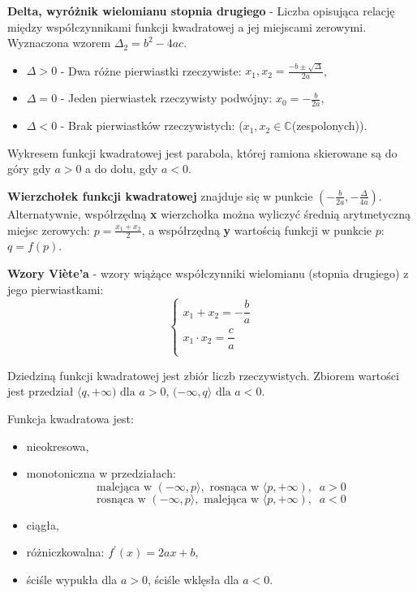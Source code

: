 \documentclass[14pt,a4paper]{extarticle}
\begin{document}
\noindent\textbf{Delta, wyróżnik wielomianu stopnia drugiego} - Liczba opisująca relację między współczynnikami funkcji 
kwadratowej a jej miejscami zerowymi. Wyznaczona wzorem $\Delta_{2} = b^{2} - 4ac$.
\begin{itemize}
   \item $\Delta > 0$ - Dwa różne pierwiastki rzeczywiste: $x_{1}, x_{2} = \frac{-b \pm\sqrt{\Delta}}{2a}$,
   \item $\Delta = 0$ - Jeden pierwiastek rzeczywisty podwójny: $x_{0} = -\frac{b}{2a}$,
   \item $\Delta < 0$ - Brak pierwiastków rzeczywistych: ($x_{1}, x_{2} \in \mathbb{C}$\;(zespolonych)).
\end{itemize}

\noindent Wykresem funkcji kwadratowej jest parabola, której ramiona skierowane są do góry gdy $a > 0$ a do dołu,
gdy $a < 0$.\hfill\break


\noindent\textbf{Wierzchołek funkcji kwadratowej} znajduje się w punkcie $\left(-\frac{b}{2a}, -\frac{\Delta}{4a}\right)$.
Alternatywnie, współrzędną \textbf{x} wierzchołka można wyliczyć średnią arytmetyczną miejsc zerowych: $p = \frac{x_{1} + x_{2}}{2}$, a 
współrzędną \textbf{y} wartością funkcji w punkcie $p$: $q = f(p)$.\hfill\break

\noindent\textbf{Wzory Viète'a} - wzory wiążące współczynniki wielomianu (stopnia drugiego) z jego pierwiastkami:\hfill\break
\begin{equation*}
   \left\{
      \begin{array}{ll}
         \!\!\!\!x_{1} + x_{2} = -\dfrac{b}{a}\\
         \!\!\!\!x_{1}\cdot x_{2} = \dfrac{c}{a}\\
      \end{array}
   \right.
   \end{equation*}

\noindent Dziedziną funkcji kwadratowej jest zbiór liczb rzeczywistych. Zbiorem wartości jest przedział
$\langle q, +\infty) \text{ dla } a > 0$, $(-\infty, q\rangle \text{ dla } a < 0$.\hfill\break

\noindent Funkcja kwadratowa jest:
\begin{itemize}
   \item nieokresowa,
   \item monotoniczna w przedziałach:
   $$\text{malejąca w }(-\infty, p\rangle, \text{ rosnąca w } \langle p, +\infty),\;\; a > 0$$
   $$\text{rosnąca w }(-\infty, p\rangle, \text{ malejąca w } \langle p, +\infty),\;\; a < 0$$
   \item ciągła,
   \item różniczkowalna: $f^{\prime}(x) = 2ax + b$,
   \item ściśle wypukła dla $a > 0$, ściśle wklęsła dla $a < 0$.

\end{itemize}
\end{document}

